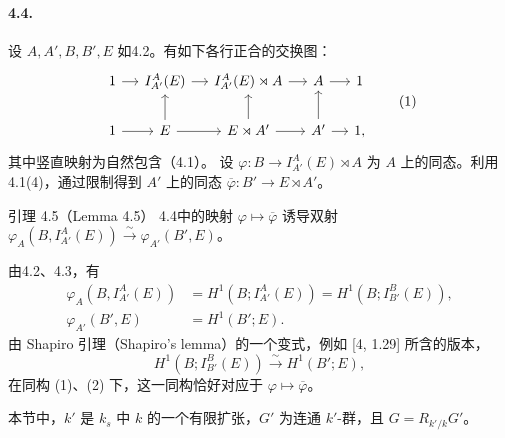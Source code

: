 \paragraph*{4.4.} 设 $A,A',B,B',E$ 如4.2。有如下各行正合的交换图：
\begin{equation}
\begin{tikzcd}[column sep=small]
 1\arrow[r]&I_{A'}^A(E)\arrow[r]&I_{A'}^A(E)\rtimes A\arrow[r]&A\arrow[r]&1\\
 1\arrow[r]&E\arrow[r]\arrow[u]&E\rtimes A'\arrow[r]\arrow[u]&A'\arrow[r]\arrow[u]&1,
\end{tikzcd}\tag{1}
\end{equation}
其中竖直映射为自然包含（4.1）。
设 $\varphi:B\to I_{A'}^A(E)\rtimes A$ 为 $A$ 上的同态。利用4.1(4)，通过限制得到 $A'$ 上的同态 $\overline\varphi:B'\to E\rtimes A'$。

\begin{originaltheorem}{引理 4.5（Lemma 4.5）}
4.4中的映射 $\varphi\mapsto\overline\varphi$ 诱导双射
$\varphi_A(B,I_{A'}^A(E))\xrightarrow{\sim}\varphi_{A'}(B',E)$。
\end{originaltheorem}
由4.2、4.3，有
\begin{align}
 \varphi_A(B,I_{A'}^A(E))&=H^1(B;I_{A'}^A(E))=H^1(B;I_{B'}^B(E)),\tag{1}\\
 \varphi_{A'}(B',E)&=H^1(B';E).\tag{2}
\end{align}
由 Shapiro 引理（Shapiro's lemma）的一个变式，例如 [4, 1.29] 所含的版本，
\[
 H^1(B;I_{B'}^B(E))\xrightarrow{\sim}H^1(B';E),
\]
在同构 (1)、(2) 下，这一同构恰好对应于 $\varphi\mapsto\overline\varphi$。

本节中，$k'$ 是 $k_s$ 中 $k$ 的一个有限扩张，$G'$ 为连通 $k'$-群，且 $G=R_{k'/k}G'$。

